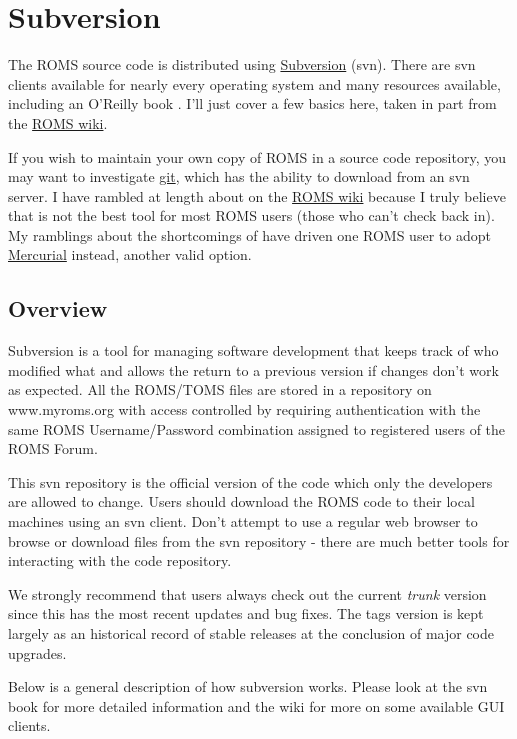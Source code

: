 \section{Subversion}
\label{Svn}

The ROMS source code is distributed using
\href{http://subversion.tigris.org}{Subversion} (svn). There are svn
clients available for nearly every operating system and many
resources available, including an O'Reilly book \citep{SVN}. I'll
just cover a few basics here, taken in part from the
\href{https://www.myroms.org/wiki/index.php/Subversion}{ROMS wiki}.

If you wish to maintain your own copy of ROMS in a source code
repository, you may want to investigate \href{http://git-scm.com/}{git},
which has the ability to download from an svn server.%
I have rambled at length about  on the
\href{https://www.myroms.org/wiki/index.php/ROMS_git}{ROMS wiki}
because I truly believe that  is not the best tool for
most ROMS users (those who can't check back in). My ramblings about
the shortcomings of  have driven one ROMS user to adopt
\href{http://mercurial.selenic.com/}{Mercurial} instead, another
valid option.

\subsection{Overview}
Subversion is a tool for managing software development that keeps
track of who modified what and allows the return to a previous
version if changes don't work as expected. All the ROMS/TOMS files
are stored in a  repository on www.myroms.org with access
controlled by requiring authentication with the same ROMS
Username/Password combination assigned to registered users of the
ROMS Forum.

This svn repository is the official version of the code which only
the developers are allowed to change. Users should download the ROMS
code to their local machines using an svn client. Don't attempt to
use a regular web browser to browse or download files from the svn
repository - there are much better tools for interacting with the
code repository.

We strongly recommend that users always check out the current {\em trunk}
version since this has the most recent updates and bug fixes. The
tags version is kept largely as an historical record of stable
releases at the conclusion of major code upgrades.

Below is a general description of how subversion works. Please look
at the svn book \citep{SVN} for more detailed information and the wiki
for more on some available GUI clients.

